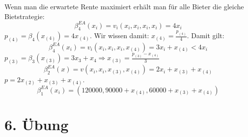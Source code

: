 \documentclass[12pt]{extreport} %
\theoremstyle{named}
\theoremstyle{itshape}
\theoremstyle{normal}
\begin{document}
Wenn man die erwartete Rente maximiert erhält man für alle Bieter die gleiche Bietstrategie:
$$ \beta_{4}^{EA}(x_{i}) = v_{i}(x_{i}, x_{i}, x_{i}, x_{i}) = 4 x_{i} $$
$p_{(4)} = \beta_{4}(x_{(4)}) = 4 x_{(4)}$. Wir wissen damit: $x_{(4)} = \frac{p_{(4)}}{4}$. Damit gilt:
$$  \beta_{4}^{EA}(x_{i}) = v_{i}(x_{i}, x_{i}, x_{i}, x_{(4)}) = 3 x_{i} + x_{(4)} < 4 x_{i}  $$
$p_{(3)} = \beta_{3}(x_{(3)}) = 3x_{3} + x_{4} \Rightarrow x_{(3)} = \frac{p_{(3)} - x_{(4)}}{3}$
$$ \beta_{2}^{EA}(x) = v(x_{i}, x_{i}, x_{(3)}, x_{(4)}) = 2x_{i} + x_{(3)} + x_{(4)} $$
$p = 2x_{(2)} + x_{(3)} + x_{(4)}$.
$$ \beta_{1}^{EA}(x_{i}) =\left( 120000, 90000 + x_{(4)}, 60000 + x_{(3)} + x_{(4)} \right) $$

\section*{6. Übung}
\end{document}

